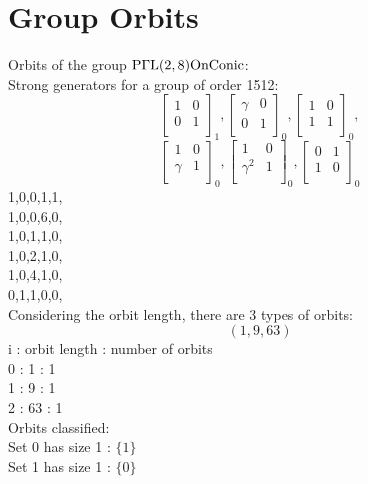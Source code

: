 \section*{Group Orbits}
Orbits of the group ${\rm P}\Gamma {\rm L}(2,8) {\rm OnConic}$:\\
Strong generators for a group of order 1512:
$$
\left[
\begin{array}{*{2}{r}}
1 & 0\\
0 & 1\\
\end{array}
\right]
_{1}
, 
\left[
\begin{array}{*{2}{r}}
\gamma  & 0\\
0 & 1\\
\end{array}
\right]
_{0}
, 
\left[
\begin{array}{*{2}{r}}
1 & 0\\
1 & 1\\
\end{array}
\right]
_{0}
, 
$$
$$
\left[
\begin{array}{*{2}{r}}
1 & 0\\
\gamma  & 1\\
\end{array}
\right]
_{0}
, 
\left[
\begin{array}{*{2}{r}}
1 & 0\\
\gamma^{2} & 1\\
\end{array}
\right]
_{0}
, 
\left[
\begin{array}{*{2}{r}}
0 & 1\\
1 & 0\\
\end{array}
\right]
_{0}
$$
1,0,0,1,1,\\
1,0,0,6,0,\\
1,0,1,1,0,\\
1,0,2,1,0,\\
1,0,4,1,0,\\
0,1,1,0,0,\\
Considering the orbit length, there are 3 types of orbits:\\
$$
( 1, 9, 63 )$$
i : orbit length : number of orbits\\
0 : 1 : 1\\
1 : 9 : 1\\
2 : 63 : 1\\
Orbits classified:\\
Set 0 has size 1 : $\{ 1 \}$\\
Set 1 has size 1 : $\{ 0 \}$\\

